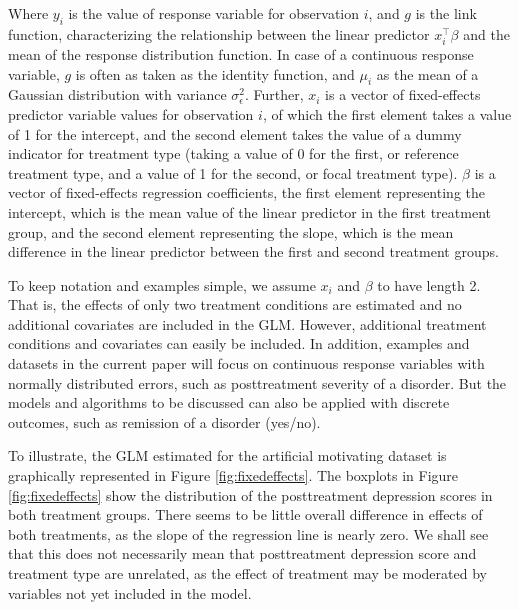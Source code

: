 \documentclass[nobf,doc]{apa}
\begin{document}
Where $y_i$ is the value of response variable for observation $i$, and $g$ is the link function, characterizing the relationship between the linear predictor $x_{i}^{\top}\beta$ and the mean of the response distribution function. In case of a continuous response variable, $g$ is often as taken as the identity function, and $\mu_{i}$ as the mean of a Gaussian distribution with variance $\sigma_{\epsilon}^2$. Further, $x_{i}$ is a vector of fixed-effects predictor variable values for observation $i$, of which the first element takes a value of 1 for the intercept, and the second element takes the value of a dummy indicator for treatment type (taking a value of 0 for the first, or reference treatment type, and a value of 1 for the second, or focal treatment type). $\beta$ is a vector of fixed-effects regression coefficients, the first element representing the intercept, which is the mean value of the linear predictor in the first treatment group, and the second element representing the slope, which is the mean difference in the linear predictor between the first and second treatment groups.  

To keep notation and examples simple, we assume $x_{i}$ and $\beta$ to have length 2. That is, the effects of only two treatment conditions are estimated and no additional covariates are included in the GLM. However, additional treatment conditions and covariates can easily be included. In addition, examples and datasets in the current paper will focus on continuous response variables with normally distributed errors, such as posttreatment severity of a disorder. But the models and algorithms to be discussed can also be applied with discrete outcomes, such as remission of a disorder (yes/no).

To illustrate, the GLM estimated for the artificial motivating dataset is graphically represented in Figure \ref{fig:fixedeffects}. The boxplots in Figure \ref{fig:fixedeffects} show the distribution of the posttreatment depression scores in both treatment groups. There seems to be little overall difference in effects of both treatments, as the slope of the regression line is nearly zero. We shall see that this does not necessarily mean that posttreatment depression score and treatment type are unrelated, as the effect of treatment may be moderated by variables not yet included in the model.
\end{document}
